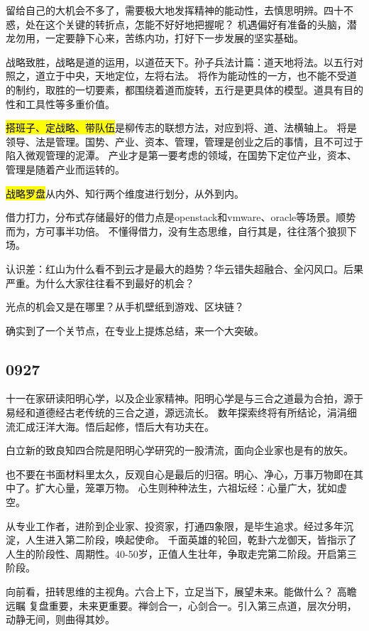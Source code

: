 留给自己的大机会不多了，需要极大地发挥精神的能动性，去慎思明辨。四十不惑，处在这个关键的转折点，怎能不好好地把握呢？
机遇偏好有准备的头脑，潜龙勿用，一定要静下心来，苦练内功，打好下一步发展的坚实基础。

战略致胜，战略是道的运用，以道莅天下。孙子兵法计篇：道天地将法。以五行对照之，道立于中央，天地定位，左将右法。
将作为能动性的一方，也不能不受道的制约，取胜的一切要素，都围绕着道而旋转，五行是更具体的模型。道具有目的性和工具性等多重价值。

\hl{搭班子、定战略、带队伍}是柳传志的联想方法，对应到将、道、法横轴上。
将是领导、法是管理。国势、产业、资本、管理，管理是创业之后的事情，且不可过于陷入微观管理的泥潭。
产业才是第一要考虑的领域，在国势下定位产业，资本、管理是随着产业而运转的。

\hl{战略罗盘}从内外、知行两个维度进行划分，从外到内。

借力打力，分布式存储最好的借力点是openstack和vmware、oracle等场景。顺势而为，方可事半功倍。
不懂得借力，没有生态思维，自行其是，往往落个狼狈下场。

认识差：红山为什么看不到云才是最大的趋势？华云错失超融合、全闪风口。后果严重。为什么大家往往看不到最好的机会？

光点的机会又是在哪里？从手机壁纸到游戏、区块链？

确实到了一个关节点，在专业上提炼总结，来一个大突破。

\subsection{0927}

十一在家研读阳明心学，以及企业家精神。阳明心学是与三合之道最为合拍，源于易经和道德经古老传统的三合之道，源远流长。
数年探索终将有所结论，涓涓细流汇成汪洋大海。悟后起修，悟后大有功夫在。

白立新的致良知四合院是阳明心学研究的一股清流，面向企业家也是有的放矢。

也不要在书面材料里太久，反观自心是最后的归宿。明心、净心，万事万物即在其中了。扩大心量，笼罩万物。
心生则种种法生，六祖坛经：心量广大，犹如虚空。

从专业工作者，进阶到企业家、投资家，打通四象限，是毕生追求。经过多年沉淀，人生进入第二阶段，唤起使命。
千面英雄的轮回，乾卦六龙御天，皆指示了人生的阶段性、周期性。40-50岁，正值人生壮年，争取走完第二阶段。开启第三阶段。

向前看，扭转思维的主视角。六合上下，立足当下，展望未来。能做什么？ 高瞻远瞩
复盘重要，未来更重要。禅剑合一，心剑合一。引入第三点道，层次分明，动静无间，则曲得其妙。

